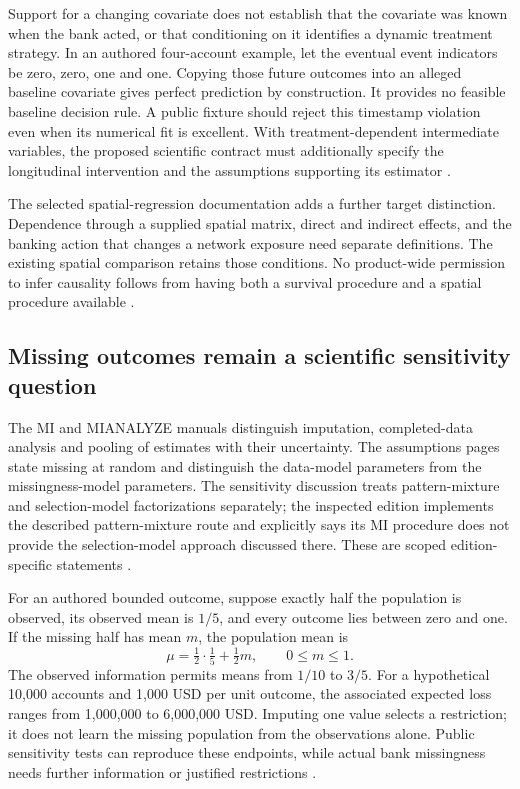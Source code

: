 Support for a changing covariate does not establish that the covariate was
known when the bank acted, or that conditioning on it identifies a dynamic
treatment strategy. In an authored four-account example, let the eventual
event indicators be zero, zero, one and one. Copying those future outcomes
into an alleged baseline covariate gives perfect prediction by construction.
It provides no feasible baseline decision rule. A public fixture should
reject this timestamp violation even when its numerical fit is excellent.
With treatment-dependent intermediate variables, the proposed scientific
contract must additionally specify the longitudinal intervention and the
assumptions supporting its estimator
\citep{exec24_sas_choice}.

The selected spatial-regression documentation adds a further target
distinction. Dependence through a supplied spatial matrix, direct and
indirect effects, and the banking action that changes a network exposure
need separate definitions. The existing spatial comparison retains those
conditions. No product-wide permission to infer causality follows from
having both a survival procedure and a spatial procedure available
\citep{exec20_network_sas_latest_spatial,exec24_sas_choice}.

\subsection{Missing outcomes remain a scientific sensitivity question}
The MI and MIANALYZE manuals distinguish imputation, completed-data analysis
and pooling of estimates with their uncertainty. The assumptions pages
state missing at random and distinguish the data-model parameters from
the missingness-model parameters. The sensitivity discussion treats
pattern-mixture and selection-model factorizations separately; the
inspected edition implements the described pattern-mixture route and
explicitly says its MI procedure does not provide the selection-model
approach discussed there. These are scoped edition-specific statements
\citep{exec21_transport_sas_mi_intro,exec21_transport_sas_mianalyze_intro,
exec21_transport_sas_assumptions,exec21_transport_sas_sensitivity}.

For an authored bounded outcome, suppose exactly half the population is
observed, its observed mean is $1/5$, and every outcome lies between zero
and one. If the missing half has mean $m$, the population mean is
\[
 \mu=\tfrac12\cdot\tfrac15+\tfrac12m,
 \qquad 0\leq m\leq1.
\]
The observed information permits means from $1/10$ to $3/5$. For a
hypothetical 10,000 accounts and 1,000 USD per unit outcome, the associated
expected loss ranges from 1,000,000 to 6,000,000 USD. Imputing one value
selects a restriction; it does not learn the missing population from the
observations alone. Public sensitivity tests can reproduce these endpoints,
while actual bank missingness needs further information or justified
restrictions \citep{exec24_sas_choice}.

